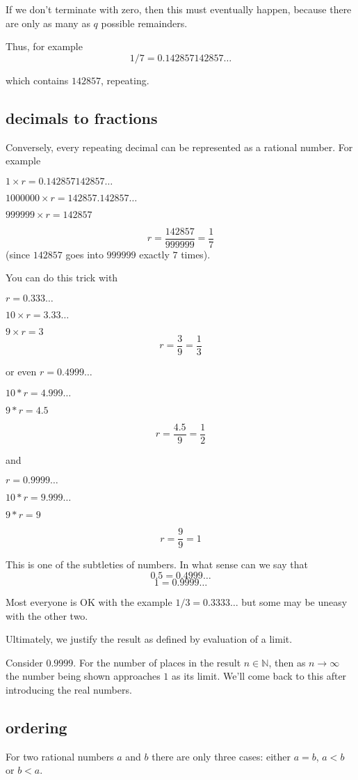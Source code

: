 \documentclass[11pt, oneside]{article}
\begin{document}
If we don't terminate with zero, then this must eventually happen, because there are only as many as $q$ possible remainders.

Thus, for example
\[ 1/7 = 0.142857142857 \dots \]

which contains $142857$, repeating.

\subsection*{decimals to fractions}

Conversely, every repeating decimal can be represented as a rational number.  For example

$1 \times r = 0.142857142857 \dots$

$1000000 \times r = 142857.142857 \dots$

$999999 \times r = 142857$

\[ r = \frac{142857}{999999} = \frac{1}{7} \]
(since $142857$ goes into $999999$ exactly $7$ times).  

You can do this trick with 

$r = 0.333 \dots$

$10 \times r = 3.33 \dots$

$9 \times r = 3$
\[ r = \frac{3}{9} = \frac{1}{3} \]

or even
$r = 0.4999 \dots$

$10*r = 4.999 \dots$

$9*r = 4.5$

\[ r = \frac{4.5}{9} = \frac{1}{2} \]

and

$r = 0.9999 \dots$

$10*r = 9.999 \dots$

$9*r = 9$

\[ r = \frac{9}{9} = 1 \]

This is one of the subtleties of numbers.  In what sense can we say that 
\[ 0.5 = 0.4999 \dots \]
\[ 1 = 0.9999 \dots \]

Most everyone is OK with the example $1/3 = 0.3333 \dots$ but some may be uneasy with the other two.

Ultimately, we justify the result as defined by evaluation of a limit.  

Consider $0.9999$.  For the number of places in the result $n \in \mathbb{N}$, then as $n \rightarrow \infty$ the number being shown approaches $1$ as its limit.  We'll come back to this after introducing the real numbers.

\subsection*{ordering}
For two rational numbers $a$ and $b$ there are only three cases:  either $a=b$, $a < b$ or $b < a$.
\end{document}
